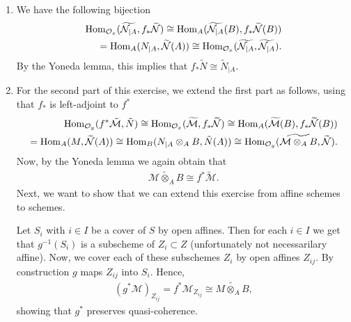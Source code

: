 \newcommand{\sheet}{7}




\maketitle{}

\begin{exercise}{1}
    \begin{enumerate}
        \item We have the following bijection
        \begin{align*}
            \operatorname{Hom}_{\mathcal{O}_x}(\widetilde{\mathcal{N}_{|A}},f_*\widetilde{\mathcal{N}})\cong \operatorname{Hom}_A (\widetilde{\mathcal{N}_{|A}}(B),f_*\widetilde{\mathcal{N}}(B))\\
            =\operatorname{Hom}_A(N_{|A},\widetilde{\mathcal{N}}(A))\cong \operatorname{Hom}_{\mathcal{O}_x}(\widetilde{\mathcal{N}_{|A}},\widetilde{\mathcal{N}_{|A}}).
        \end{align*}
        By the Yoneda lemma, this implies that $f_*\widetilde{N}\cong \tilde{N}_{|A}$.
        \item For the second part of this exercise, we extend the first part as follows, using that $f_*$ is left-adjoint to $f^*$
        \begin{align*}
            \operatorname{Hom}_{\mathcal{O}_y}(f^*\tilde{\mathcal{M}},\tilde{N})
            \cong \operatorname{Hom}_{\mathcal{O}_x}(\widetilde{\mathcal{M}},f_*\widetilde{\mathcal{N}})
            \cong \operatorname{Hom}_A (\widetilde{\mathcal{M}}(B),f_*\widetilde{\mathcal{N}}(B))\\
            = \operatorname{Hom}_A(M,\widetilde{\mathcal{N}}(A))
            \cong \operatorname{Hom}_B(N_{|A}\otimes_A B, \tilde{N}(A))
            \cong \operatorname{Hom}_{\mathcal{O}_y}(\widetilde{\mathcal{M}\otimes_A B}, \widetilde{\mathcal{N}}).
        \end{align*} 
        Now, by the Yoneda lemma we again obtain that 
        \begin{align*}
            \widetilde{\mathcal{M}\otimes_A B} 
            \cong f^*\tilde{\mathcal{M}}.
        \end{align*}
        Next, we want to show that we can extend this exercise from affine schemes to schemes.
        
        Let $S_i$ with $i\in I$ be a cover of $S$ by open affines. Then for each $i\in I$ we get that
        $g^{-1}(S_i)$ is a subscheme of $Z_i\subset Z$ (unfortunately not necessarilary affine). Now, we cover
        each of these subschemes $Z_i$ by open affines $Z_{ij}$. By construction $g$ maps $Z_{ij}$ into $S_i$.
        Hence, 
        \begin{align*}
            (g^*\mathcal{M})_{Z_{ij}}=f^*\mathcal{M}_{Z_{ij}}\cong \widetilde{M\otimes_A B},
        \end{align*}
        showing that $g^*$ preserves quasi-coherence.
    \end{enumerate}
\end{exercise}


